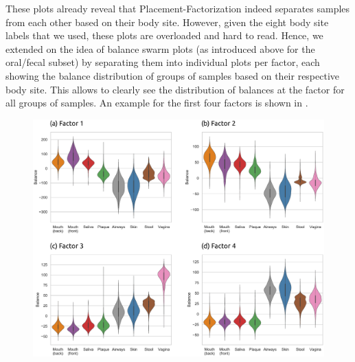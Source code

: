 These plots already reveal that Placement-Factorization indeed separates samples from each other based on their body site.
However, given the eight body site labels that we used, these plots are overloaded and hard to read.
Hence, we extended on the idea of balance swarm plots (as introduced above for the oral/fecal subset)
by separating them into individual plots per factor,
each showing the balance distribution of groups of samples based on their respective body site.
This allows to clearly see the distribution of balances at the factor for all groups of samples.
An example for the first four factors is shown in .

\begin{figure}[!htpb]
    \centering
     \includegraphics[width=\linewidth]{pdf/hmp_pf_all_violins.pdf}
    \begin{subfigure}{0pt}
        \label{fig:hmp_pf_all_violins:sub:factor_1}
    \end{subfigure}
    \begin{subfigure}{0pt}
        \label{fig:hmp_pf_all_violins:sub:factor_2}
    \end{subfigure}
    \begin{subfigure}{0pt}
        \label{fig:hmp_pf_all_violins:sub:factor_3}
    \end{subfigure}
    \begin{subfigure}{0pt}
        \label{fig:hmp_pf_all_violins:sub:factor_4}
    \end{subfigure}

\end{figure}
